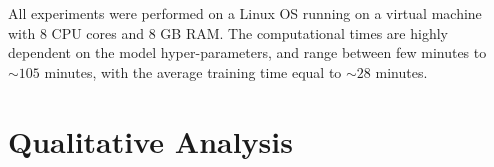 \documentclass[11pt,a4paper]{article}
\begin{document}
All experiments were performed on a Linux OS running on a virtual machine with $8$ CPU cores and $8$ GB RAM. The computational times are highly dependent on the model hyper-parameters, and range between few minutes to $\sim105$ minutes, with the average training time equal to $\sim28$ minutes.


 \begin{comment}

\begin{table*}[ht!]
\small
\centering
\begin{tabular}
{>{\centering\arraybackslash}m{1.5cm} | 
>{\centering\arraybackslash}m{1.5cm}
>{\centering\arraybackslash}m{1.5cm}  
>{\centering\arraybackslash}m{1.5cm}
>{\centering\arraybackslash}m{1.5cm}
>{\centering\arraybackslash}m{1.5cm}}

\toprule
\textbf{Model} & 
\textbf{BLEU-1 (\%)} & \textbf{BLEU-2 (\%)} & \textbf{BLEU-3 (\%)} & \textbf{BLEU-4 (\%)} & \textbf{ACC (\%)}  \\
\midrule
\textit{Best hyperparameter model} &  &  & &  & \\
\midrule
\textit{TL with CoNaLa} &  &  &  &  &  \\
\midrule
\textit{TL with Django} & & & & & \\
\bottomrule
\end{tabular}
\caption{Performance across metrics after transfer learning (TL) using CoNaLa and Django datasets}
\label{tab:tl}
\end{table*}
\end{comment}


 

\section{Qualitative Analysis}
\label{sec:qualitative}
\end{document}
